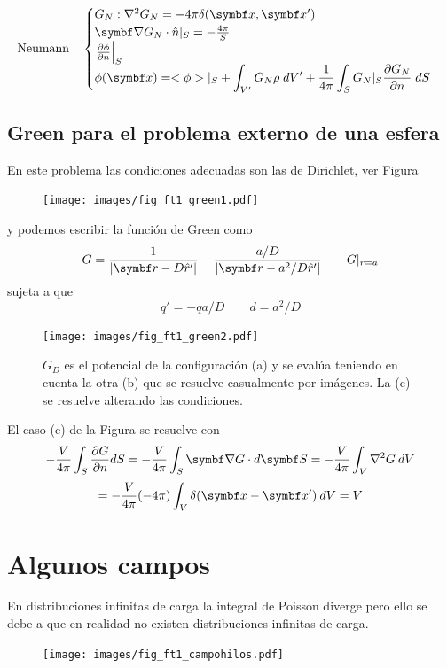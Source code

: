 \documentclass[10pt,oneside]{CBFT_book}
\begin{document}
\[
	\textrm{Neumann} \quad 	\begin{cases}
				G_N : \lapm{G_N} = -4\pi \delta(\vb{x},\vb{x}') \\
				\Nabla G_N \cdot \hat{n}|_S = -\frac{4\pi}{S}  \\
				\left.\dpar{\phi}{n}\right|_S \\
				\phi(\vb{x}) = \displaystyle <\phi>|_S + \int_{V'} G_N \rho \; dV' + 
				\frac{1}{4\pi} \int_{S} G_N|_S \dpar{G_N}{n} \; dS
			\end{cases}
\]

\subsection{Green para el problema externo de una esfera}

En este problema las condiciones adecuadas son las de Dirichlet, ver Figura
\begin{figure}[htb]
	\begin{center}
	\texttt{[image: images/fig\_ft1\_green1.pdf]}	 
	\end{center}
	\caption{}
\end{figure} 
y podemos escribir la función de Green como 
\[
	G = \frac{1}{|\vb{r} - D\hat{r}'|} - \frac{a/D}{|\vb{r} - a^2/D\hat{r}'|} \qquad G|_{r=a}
\]
sujeta a que 
\[
	q' = -q a/D \qquad d = a^2/D
\]
\begin{figure}[htb]
	\begin{center}
	\texttt{[image: images/fig\_ft1\_green2.pdf]}	 
	\end{center}
	\caption{$G_D$ es el potencial de la configuración (a) y se evalúa teniendo en cuenta la
	otra (b) que se resuelve casualmente por imágenes. La (c) se resuelve alterando las condiciones.}
\end{figure} 

El caso (c) de la Figura se resuelve con 
\[
	-\frac{V}{4\pi} \int_S \dpar{G}{n} dS = -\frac{V}{4\pi} \int_S \Nabla G\cdot d\vb{S} =
	-\frac{V}{4\pi} \int_V \lapm{G} \: dV	
\]
\[
	= -\frac{V}{4\pi} (-4\pi)\int_V \delta(\vb{x}-\vb{x}') \: dV	= V 
\]

\section{Algunos campos}

En distribuciones infinitas de carga la integral de Poisson diverge pero ello se debe a que en
realidad no existen distribuciones infinitas de carga.
\begin{figure}[thb]
	\begin{center}
	\texttt{[image: images/fig\_ft1\_campohilos.pdf]}	 
	\end{center}
	\caption{}
\end{figure} 
\end{document}
